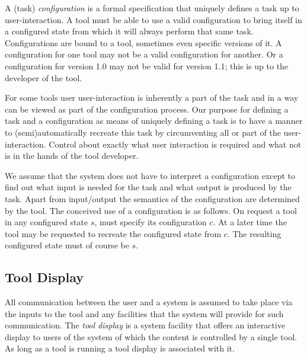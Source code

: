 \documentclass{article}
\begin{document}
   A (task) \textit{configuration} is a formal specification that uniquely
   defines a task up to user-interaction. A tool must be able to use a valid
   configuration to bring itself in a configured state from which it will
   always perform that same task. Configurations are bound to a tool, sometimes
   even specific versions of it. A configuration for one tool may not be a
   valid configuration for another. Or a configuration for version 1.0 may not
   be valid for version 1.1; this is up to the developer of the tool.
   
   For some tools user user-interaction is inherently a part of the task and in
   a way can be viewed as part of the configuration process. Our purpose for
   defining a task and a configuration as means of uniquely defining a task is
   to have a manner to (semi)automatically recreate this task by circumventing
   all or part of the user-interaction. Control about exactly what user
   interaction is required and what not is in the hands of the tool developer.

   We assume that the system does not have to interpret a configuration except
   to find out what input is needed for the task and what output is produced by
   the task. Apart from input/output the semantics of the configuration are
   determined by the tool. The conceived use of a configuration is as follows.
   On request a tool in any configured state $s$, must specify its
   configuration $c$.  At a later time the tool may be requested to recreate
   the configured state from $c$. The resulting configured state must of course
   be $s$.



  \subsection{Tool Display}

   All communication between the user and a system is assumed to take place via
   the inputs to the tool and any facilities that the system will provide for
   such communication. The \textit{tool display} is a system facility that
   offers an interactive display to users of the system of which the content is
   controlled by a single tool. As long as a tool is running a tool display is
   associated with it.
\end{document}
